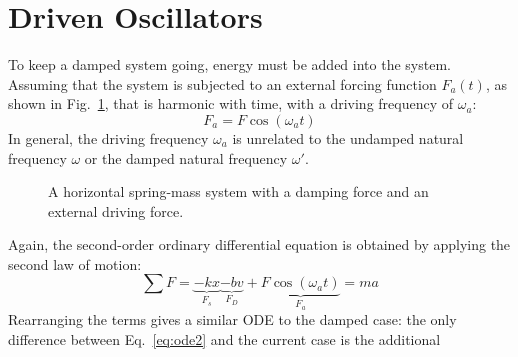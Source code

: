 \section{Driven Oscillators}
To keep a damped system going, energy must be added into the system. Assuming
that the system is subjected to an external forcing function $F_a(t)$, as shown
in Fig.~\ref{fig:driven1}, that is harmonic with time, with a driving frequency
of $\omega_a$:
\begin{equation}
  \boxed{
    F_a=F\cos(\omega_at)
  }
\end{equation}
In general, the driving frequency $\omega_a$ is unrelated to the undamped
natural frequency $\omega$ or the damped natural frequency $\omega'$.
\begin{figure}[t]
  \centering
  \caption{A horizontal spring-mass system with a damping force and an external
    driving force.}
  \label{fig:driven1}
\end{figure}
Again, the second-order ordinary differential equation is obtained by
applying the second law of motion:
\begin{equation}
  \sum F=
  \underbrace{-kx}_{F_s}\underbrace{-bv}_{F_D}+
  \underbrace{F\cos(\omega_at)}_{F_a}=ma
\end{equation}
Rearranging the terms gives a similar ODE to the damped case: the only
difference between Eq.~\ref{eq:ode2} and the current case is the additional
